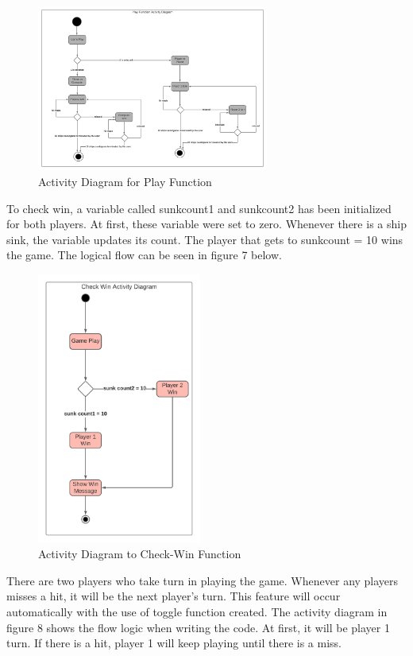 \documentclass[12pt]{article}
\begin{document}
\begin{figure}[H]
    \centering
    \includegraphics[width=0.68\textwidth]{HEL_template/figures/playf.jpeg}
    \caption{Activity Diagram for Play Function}
    \label{play}
\end{figure}

To check win, a variable called sunkcount1 and sunkcount2 has been initialized for both players. At first, these variable were set to zero. Whenever there is a ship sink, the variable updates its count. The player that gets to sunkcount = 10 wins the game. The logical flow can  be seen in figure 7 below.

\begin{figure}[H]
    \centering
    \includegraphics[width=0.48\textwidth]{HEL_template/figures/Checkwin.jpeg}
    \caption{Activity Diagram to Check-Win Function}
    \label{checkwin}
\end{figure}

There are two players who take turn in playing the game. Whenever any players misses a hit, it will be the next player's turn. This feature will occur automatically with the use of toggle function created. The activity diagram in figure 8 shows the flow logic when writing the code. At first, it will be player 1 turn. If there is a hit, player 1 will keep playing until there is a miss.
\end{document}
